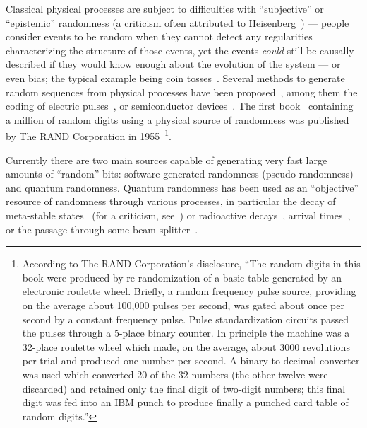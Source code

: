 \documentclass[%
 preprint,
 showpacs,
 showkeys,
 preprintnumbers,
 amsmath,amssymb,
 aps,
 prl,
  longbibliography,
 ]{revtex4-1}
\begin{document}
Classical physical processes are subject to difficulties with ``subjective''  or ``epistemic'' randomness
(a criticism often attributed to Heisenberg~\cite{zeil-05_nature_ofQuantum})
---
people consider events to be random when they cannot detect
any regularities characterizing the structure of those events,
yet the events {\em could} still be causally described if they
would  know enough about the evolution of the system
---
or even bias; the typical example being coin tosses~\cite{diaconis:211}.
Several methods to generate random sequences from physical processes have been proposed~\cite{csw:prg},
among them the coding of electric pulses~\cite{0022-3735-3-8-303},
or semiconductor devices~\cite{Agnew-87,Aware,Araneus,comscire,LavaRnd,dynes:031109,Ma:05,stipcevic045104,Wayne-09}.
The first book~\cite{rand-55} containing a  million  of random digits  using a physical source of randomness
was published by The RAND Corporation in  1955~\footnote{According to The RAND Corporation's disclosure,
``The random digits in this book were produced by re-randomization of a basic table generated
by an electronic roulette wheel. Briefly, a random frequency pulse source,
providing on the average about 100,000 pulses per second, was gated about once
per second by a constant frequency pulse. Pulse standardization circuits passed
the pulses through a 5-place binary counter. In principle the machine was a 32-place
roulette wheel which made, on the average, about 3000 revolutions per trial and produced
one number per second. A binary-to-decimal converter was used which converted 20 of the 32 numbers
(the other twelve were discarded) and retained only the final digit of two-digit numbers;
this final digit was fed into an IBM punch to produce finally a punched card table of random digits.''
}.





Currently there are two main sources capable of generating very fast large amounts of  ``random''
bits: software-generated randomness
(pseudo-randomness) and quantum randomness. Quantum randomness has been used as an ``objective'' resource of randomness
through various processes, in particular the decay of meta-stable states~\cite{PhysRevLett.54.1023,er-put:85,erber-95}
(for a criticism, see~\cite{knight-86}) or radioactive decays~\cite{schmidt:462,walker-hotbits},
arrival times~\cite{stipcevic4442,stipcevic045104,dynes:031109,Ma:05,Wayne-09},
or the passage through some beam splitter~\cite{svozil-qct,rarity-94,zeilinger:qct,stefanov-2000,0256-307X-21-10-027,wang:056107,fiorentino:032334,svozil-2009-howto,Kwon:09}.
\end{document}
